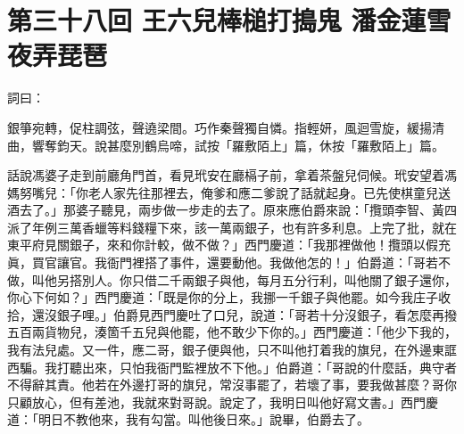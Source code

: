 
\chapter*{第三十八回 王六兒棒槌打搗鬼 潘金蓮雪夜弄琵琶}


詞曰：

\begin{myquote}
銀箏宛轉，促柱調弦，聲遶梁間。巧作秦聲獨自憐。指輕妍，風迴雪旋，緩揚清曲，響奪鈞天。說甚麼別鶴烏啼，試按「羅敷陌上」篇，休按「羅敷陌上」篇。

\end{myquote}

話說馮婆子走到前廳角門首，看見玳安在廳槅子前，拿着茶盤兒伺候。玳安望着馮媽努嘴兒：「你老人家先往那裡去，俺爹和應二爹說了話就起身。已先使棋童兒送酒去了。」那婆子聽見，兩步做一步走的去了。原來應伯爵來說：「攬頭李智、黃四派了年例三萬香蠟等料錢糧下來，該一萬兩銀子，也有許多利息。上完了批，就在東平府見關銀子，來和你計較，做不做？」西門慶道：「我那裡做他！攬頭以假充眞，買官讓官。我衙門裡搭了事件，還要動他。我做他怎的！」伯爵道：「哥若不做，叫他另搭別人。你只借二千兩銀子與他，每月五分行利，叫他關了銀子還你，你心下何如？」西門慶道：「既是你的分上，我挪一千銀子與他罷。如今我庄子收拾，還沒銀子哩。」伯爵見西門慶吐了口兒，說道：「哥若十分沒銀子，看怎麼再撥五百兩貨物兒，湊箇千五兒與他罷，他不敢少下你的。」西門慶道：「他少下我的，我有法兒處。又一件，應二哥，銀子便與他，只不叫他打着我的旗兒，在外邊東誆西騙。我打聽出來，只怕我衙門監裡放不下他。」伯爵道：「哥說的什麼話，典守者不得辭其責。他若在外邊打哥的旗兒，常沒事罷了，若壞了事，要我做甚麼？哥你只顧放心，但有差池，我就來對哥說。說定了，我明日叫他好寫文書。」西門慶道：「明日不教他來，我有勾當。叫他後日來。」說畢，伯爵去了。

